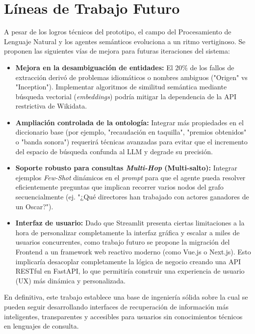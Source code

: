 \section{Líneas de Trabajo Futuro}

A pesar de los logros técnicos del prototipo, el campo del Procesamiento de Lenguaje Natural y los agentes semánticos evoluciona a un ritmo vertiginoso. Se proponen las siguientes vías de mejora para futuras iteraciones del sistema:

\begin{itemize}
    \item \textbf{Mejora en la desambiguación de entidades:} El 20\% de los fallos de extracción derivó de problemas idiomáticos o nombres ambiguos ("Origen" vs "Inception"). Implementar algoritmos de similitud semántica mediante búsqueda vectorial (\textit{embeddings}) podría mitigar la dependencia de la API restrictiva de Wikidata.
    \item \textbf{Ampliación controlada de la ontología:} Integrar más propiedades en el diccionario base (por ejemplo, "recaudación en taquilla", "premios obtenidos" o "banda sonora") requerirá técnicas avanzadas para evitar que el incremento del espacio de búsqueda confunda al LLM y degrade su precisión.
    \item \textbf{Soporte robusto para consultas \textit{Multi-Hop} (Multi-salto):} Integrar ejemplos \textit{Few-Shot} dinámicos en el \textit{prompt} para que el agente pueda resolver eficientemente preguntas que implican recorrer varios nodos del grafo secuencialmente (ej. "¿Qué directores han trabajado con actores ganadores de un Oscar?").
    \item \textbf{Interfaz de usuario:} Dado que Streamlit presenta ciertas limitaciones a la hora de personalizar completamente la interfaz gráfica y escalar a miles de usuarios concurrentes, como trabajo futuro se propone la migración del Frontend a un framework web reactivo moderno (como Vue.js o Next.js). Esto implicaría desacoplar completamente la lógica de negocio creando una API RESTful en FastAPI, lo que permitiría construir una experiencia de usuario (UX) más dinámica y personalizada.
\end{itemize}

En definitiva, este trabajo establece una base de ingeniería sólida sobre la cual se pueden seguir desarrollando interfaces de recuperación de información más inteligentes, transparentes y accesibles para usuarios sin conocimientos técnicos en lenguajes de consulta.
